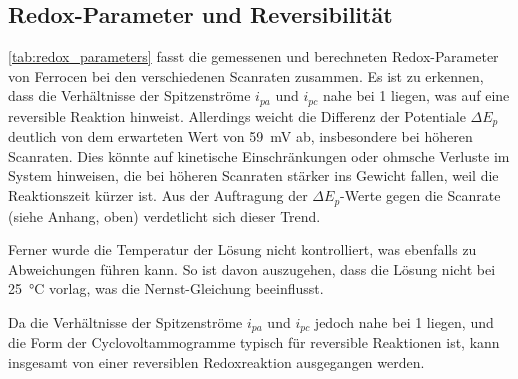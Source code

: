 \subsection{Redox-Parameter und Reversibilität}

\autoref{tab:redox_parameters} fasst die gemessenen und berechneten Redox-Parameter von Ferrocen bei den verschiedenen Scanraten zusammen.
Es ist zu erkennen, dass die Verhältnisse der Spitzenströme $i_{pa}$ und $i_{pc}$ nahe bei 1 liegen, was auf eine reversible Reaktion hinweist.
Allerdings weicht die Differenz der Potentiale $\Delta E_p$ deutlich von dem erwarteten Wert von \qty{59}{\milli\volt} ab, insbesondere bei höheren Scanraten.
Dies könnte auf kinetische Einschränkungen oder ohmsche Verluste im System hinweisen, die bei höheren Scanraten stärker ins Gewicht fallen, weil die Reaktionszeit kürzer ist.
Aus der Auftragung der $\Delta E_p$-Werte gegen die Scanrate (siehe Anhang, oben) verdetlicht sich dieser Trend.

Ferner wurde die Temperatur der Lösung nicht kontrolliert, was ebenfalls zu Abweichungen führen kann.
So ist davon auszugehen, dass die Lösung nicht bei \qty{25}{\degreeCelsius} vorlag, was die Nernst-Gleichung beeinflusst.

Da die Verhältnisse der Spitzenströme $i_{pa}$ und $i_{pc}$ jedoch nahe bei 1 liegen, und die Form der Cyclovoltammogramme typisch für reversible Reaktionen ist,
kann insgesamt von einer reversiblen Redoxreaktion ausgegangen werden.

